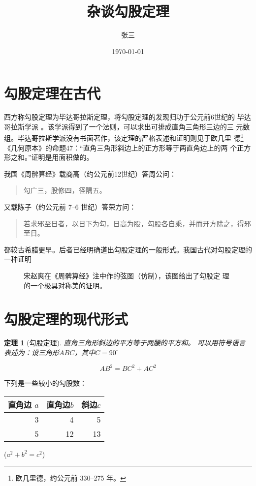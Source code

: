 \documentclass{ctexart}
\title{杂谈勾股定理}
\author{张三}
\date{\today}
\newtheorem{thm}{定理}
\begin{document}
\maketitle
\tableofcontents
\section{勾股定理在古代}
西方称勾股定理为毕达哥拉斯定理，将勾股定理的发现归功于公元前6世纪的
毕达哥拉斯学派 \cite{Kline}。该学派得到了一个法则，可以求出可排成直角三角形三边的三
元数组。毕达哥拉斯学派没有书面著作，该定理的严格表述和证明则见于欧几里
德{\footnote{欧几里德，约公元前 330--275 年。}}《几何原本》的命题47：“直角三角形斜边上的正方形等于两直角边上的两
个正方形之和。”证明是用面积做的。

我国《周髀算经》载商高（约公元前12世纪）答周公问：
\begin{quote}
\kaishu 勾广三，股修四，径隅五。
\end{quote}
又载陈子（约公元前 7--6 世纪）答荣方问：
\begin{quote}
\kaishu 若求邪至日者，以日下为勾，日高为股，勾股各自乘，并而开方除之，得邪至日。
\end{quote}
都较古希腊更早。后者已经明确道出勾股定理的一般形式。我国古代对勾股定理的一种证明\cite{quanjing}
\begin{figure}
    \centering
    \caption[short]{宋赵爽在《周髀算经》注中作的弦图（仿制），该图给出了勾股定
    理的一个极具对称美的证明。}
    \label{fig:xiantu}
\end{figure}
\section{勾股定理的现代形式}
\begin{thm}[勾股定理]
直角三角形斜边的平方等于两腰的平方和。
可以用符号语言表述为：设三角形$ABC$，其中\angle$C=90^\circ$
\end{thm}
\begin{equation}
    AB^2=BC^2+AC^2
\end{equation}

下列是一些较小的勾股数：
\begin{table}[H]
\begin{tabular}{|rrr|}
    \hline
    直角边 $a$ & 直角边$b$ & 斜边$c$\\
    \hline
    3 & 4 & 5\\
    \hline
    5 & 12 & 13\\
    \hline
\end{tabular}
\qquad
($a^2+b^2=c^2$)
\end{table}
\end{document}
